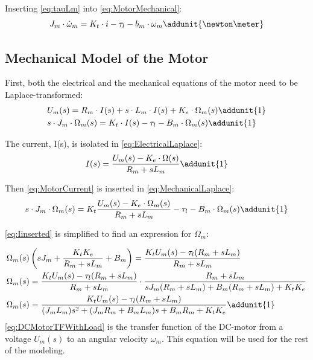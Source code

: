 \startexplain
\stopexplain

Inserting \autoref{eq:tauLm} into \autoref{eq:MotorMechanical}:
\begin{equation}
	J_{m} \cdot \dot{\omega}_{m} = K_{t} \cdot i - \tau_{l} - b_{m} \cdot \omega_{m} \addunit{\newton\meter}
\end{equation}

\subsection*{Mechanical Model of the Motor}
First, both the electrical and the mechanical equations of the motor need to be Laplace-transformed:
\begin{subequations}
	\begin{flalign}
		&U_{m}(s) = R_{m} \cdot I(s) + s \cdot L_{m} \cdot I(s) + K_{e} \cdot \Omega_{m}(s) \addunit{1} \label{eq:ElectricalLaplace}\\	
		&s\cdot J_{m} \cdot \Omega_{m}(s) = K_{t} \cdot I(s) - \tau_{l} - B_{m} \cdot \Omega_{m}(s) \addunit{1}	\label{eq:MechanicalLaplace}
	\end{flalign}
\end{subequations}

The current, I(s), is isolated in \autoref{eq:ElectricalLaplace}:
\begin{equation}
	I(s)=\frac{U_m(s)-K_e\cdot\Omega(s)}{R_m+sL_m} \addunit{1}
	\label{eq:MotorCurrent}
\end{equation}

Then \autoref{eq:MotorCurrent} is inserted in \autoref{eq:MechanicalLaplace}:
\begin{equation}
	s\cdot J_{m} \cdot \Omega_{m}(s) = K_{t} \frac{U_m(s)-K_e\cdot\Omega_{m}(s)}{R_m+sL_m} - \tau_{l} - B_{m} \cdot \Omega_{m}(s) \addunit{1}
	\label{eq:Iinserted}	
\end{equation}

\autoref{eq:Iinserted} is simplified to find an expression for $\Omega_m$: 

\begin{subequations}
	\begin{flalign}
		&\Omega_m(s) \left(sJ_m + \frac{K_tK_e}{R_m + sL_m} + B_m \right) = \frac{K_tU_m(s) - \tau_l(R_m + sL_m)}{R_m + sL_m} \\	
		&\Omega_m(s) = \frac{K_tU_m(s) - \tau_l(R_m + sL_m)}{R_m + sL_m} \cdot \frac{R_m + sL_m}{sJ_m(R_m + sL_m) + B_m(R_m + sL_m) + K_tK_e} \\
		&\Omega_m(s) = \frac{K_tU_m(s) - \tau_l(R_m + sL_m)}{(J_mL_m)s^2 + (J_mR_m + B_mL_m)s + B_mR_m + K_tK_e} \addunit{1} \label{eq:DCMotorTFWithLoad}
	\end{flalign}
\end{subequations}
\autoref{eq:DCMotorTFWithLoad} is the transfer function of the DC-motor from a voltage $U_m(s)$ to an angular velocity $\omega_m$. This equation will be used for the rest of the modeling. 

